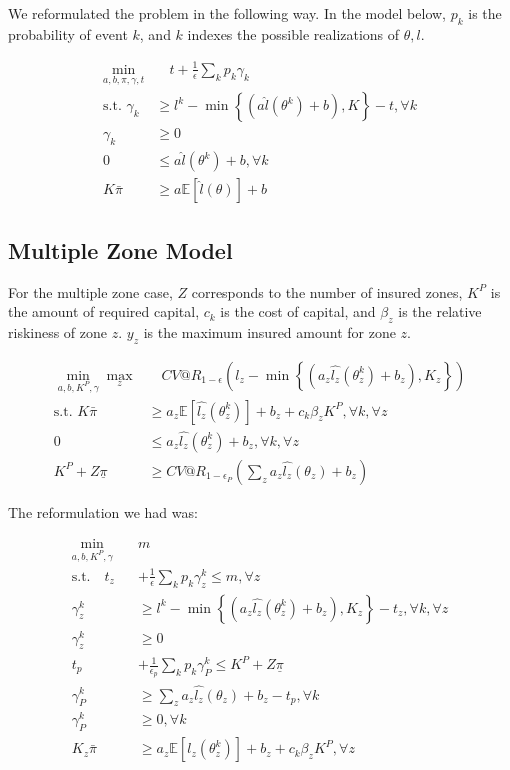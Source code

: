 \documentclass[11pt]{article}
\begin{document}
We reformulated the problem in the following way. In the model below, $p_k$ is the probability of event $k$, and $k$ indexes the possible realizations of $\theta, l$.

\begin{align}
    \min_{a,b,\pi,\gamma,t} &\quad t + \frac{1}{\epsilon}\sum_k p_k \gamma_k\\
    \text{s.t.   } \gamma_k &\geq l^k - \min\left\{(a\hat{l}(\theta^k) + b), K\right\} - t, \forall k\\
    \gamma_k &\geq 0 \\
    0 &\leq a\hat{l}(\theta^k) + b, \forall k\\
    K\bar{\pi} &\geq a\mathbb{E}[\hat{l}(\theta)] + b
\end{align}

\subsection*{Multiple Zone Model}
For the multiple zone case, $Z$ corresponds to the number of insured zones, $K^P$ is the amount of required capital, $c_k$ is the cost of capital, and $\beta_z$ is the relative riskiness of zone $z$. $y_z$ is the maximum insured amount for zone $z$. 

\begin{align}
    \min_{a,b,K^P,\gamma} \max_z &\quad CV@R_{1-\epsilon}(l_z - \min\left\{(a_z\hat{l_z}(\theta_z^k) + b_z), K_z\right\})\\
    \text{s.t.   } K\bar{\pi} &\geq a_z \mathbb{E}[\hat{l_z}(\theta^k_z)] + b_z + c_k\beta_z K^P,  \forall k, \forall z\\
    0 &\leq a_z\hat{l_z}(\theta^k_z) + b_z, \forall k, \forall z \\
    K^P + Z\underline{\pi} &\geq CV@R_{1-\epsilon_P}\left( \sum_z a_z \hat{l_z}(\theta_z) + b_z \right)
\end{align}

The reformulation we had was: 

\begin{align}
    \min_{a,b,K^P,\gamma} \quad & m\\
    \text{s.t.} \quad t_z &+ \frac{1}{\epsilon} \sum_k p_k \gamma_z^k \leq m, \forall z\\
    \gamma_z^k &\geq l^k - \min\left\{(a_z\hat{l_z}(\theta_z^k) + b_z), K_z\right\} -t_z, \forall k, \forall z \\
    \gamma_z^k &\geq 0\\
    t_p &+ \frac{1}{\epsilon_p} \sum_k p_k \gamma_P^k \leq K^P+Z\underline{\pi}\\
    \gamma_P^k &\geq \sum_z a_z \hat{l_z}(\theta_z) + b_z -t_p, \forall k \\
    \gamma_P^k &\geq 0, \forall k\\
    K_z\bar{\pi} &\geq a_z \mathbb{E}[\hat{l_z}(\theta^k_z)] + b_z + c_k \beta_z K^P, \forall z
\end{align}
\end{document}

